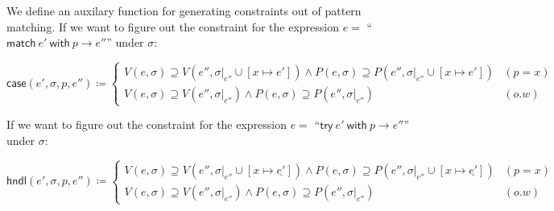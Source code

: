 \documentclass{article}
\newcommand*\vbar{|}
\begin{document}
We define an auxilary function for generating constraints out of pattern matching.
If we want to figure out the constraint for the expression $e=$ ``$\mathsf{match}\: e' \: \mathsf{with}\: p\rightarrow e''$'' under $\sigma$:

\[
\mathsf{case}(e',\sigma,p,e'')\coloneq
\begin{cases}
  V(e,\sigma) \supseteq V(e'',\sigma\vbar_{e''} \cup [x \mapsto e']) \wedge P(e,\sigma) \supseteq P(e'',\sigma\vbar_{e''} \cup [x \mapsto e'])& (p=x)\\
  V(e,\sigma) \supseteq V(e'',\sigma\vbar_{e''}) \wedge P(e,\sigma) \supseteq P(e'',\sigma\vbar_{e''}) & (o.w)
\end{cases}
\]

If we want to figure out the constraint for the expression $e=$ ``$\mathsf{try}\: e' \: \mathsf{with}\: p\rightarrow e''$'' under $\sigma$:

\[
  \mathsf{hndl}(e',\sigma,p,e'')\coloneq
  \begin{cases}
    V(e,\sigma) \supseteq V(e'',\sigma\vbar_{e''} \cup [x \mapsto \underline{e'}]) \wedge P(e,\sigma) \supseteq P(e'',\sigma\vbar_{e''} \cup [x \mapsto \underline{e'}]) & (p=x)\\
    V(e,\sigma) \supseteq V(e'',\sigma\vbar_{e''}) \wedge P(e,\sigma) \supseteq P(e'',\sigma\vbar_{e''}) & (o.w)
  \end{cases}
\]
\end{document}
